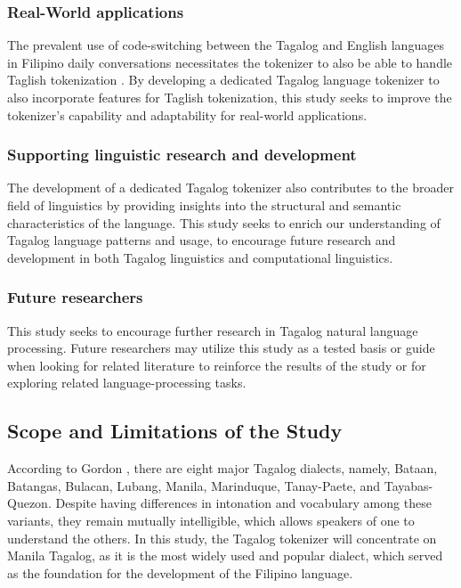 \documentclass[journal]{./IEEE/IEEEtran}
\begin{document}
\subsubsection{Real-World applications} 

 The prevalent use of code-switching between the Tagalog and English languages in Filipino daily conversations necessitates the tokenizer to also be able to handle Taglish tokenization {\cite{TweetTaglish}}. By developing a dedicated Tagalog language tokenizer to also incorporate features for Taglish tokenization, this study seeks to improve the tokenizer’s capability and adaptability for real-world applications. \\

 \subsubsection{Supporting linguistic research and development}

 The development of a dedicated Tagalog tokenizer also contributes to the broader field of linguistics by providing insights into the structural and semantic characteristics of the language. This study seeks to enrich our understanding of Tagalog language patterns and usage, to encourage future research and development in both Tagalog linguistics and computational linguistics. \\

\subsubsection{Future researchers}

This study seeks to encourage further research in Tagalog natural language processing. Future researchers may utilize this study as a tested basis or guide when looking for related literature to reinforce the results of the study or for exploring related language-processing tasks. \\

\subsection{Scope and Limitations of the Study}

According to Gordon {\cite{TagalogVariants}}, there are eight major Tagalog dialects, namely,  Bataan, Batangas, Bulacan, Lubang, Manila, Marinduque, Tanay-Paete, and Tayabas-Quezon. Despite having differences in intonation and vocabulary among these variants, they remain mutually intelligible, which allows speakers of one to understand the others. In this study, the Tagalog tokenizer will concentrate on Manila Tagalog, as it is the most widely used and popular dialect, which served as the foundation for the development of the Filipino language. \\
\end{document}
